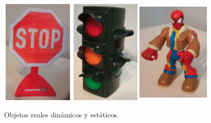 \begin{figure} [h!]
	\begin{center}
		\includegraphics[width=3.5cm, height=5cm]{figs/realstopsign}\hspace{0.5cm}\includegraphics[width=3.5cm, height=5cm]{figs/realtrafficlight}\hspace{0.5cm}\includegraphics[width=3.5cm, height=5cm]{figs/realpedestrian}
	\end{center}
	\caption{Objetos reales dinámicos y estáticos.}
	\label{fig:objects}
\end{figure}\

